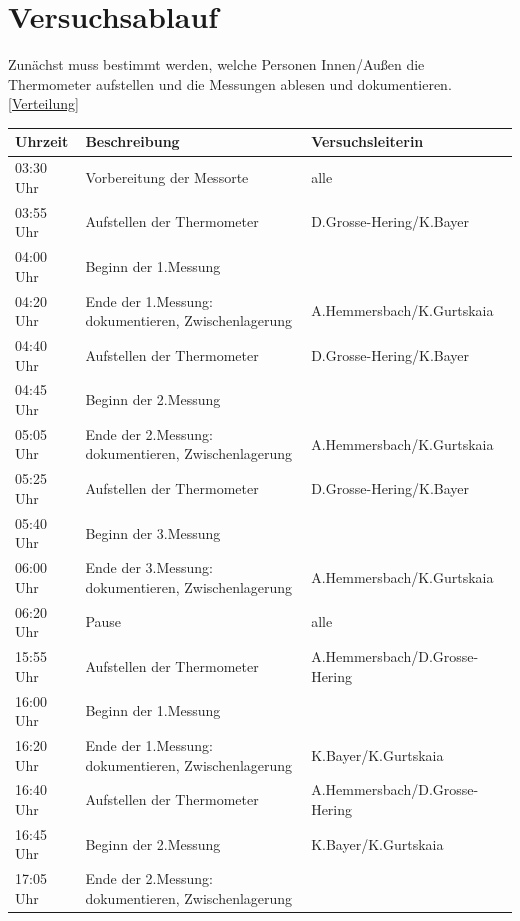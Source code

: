 \documentclass[ ngerman, fontsize= 12pt, paper=a4, headings=big, titlepage=true]{article}
\begin{document}
	\section{Versuchsablauf}
	Zunächst muss bestimmt werden, welche Personen Innen/Außen die Thermometer aufstellen und die Messungen ablesen und dokumentieren. \ref{Verteilung}
	\begin{table}[h]
		\begin{tabular}{l|l|l}
			
			Uhrzeit		&	Beschreibung									&	Versuchsleiterin \\
			\hline
			03:30 Uhr	&	Vorbereitung der Messorte						& alle\\
			03:55 Uhr	&	Aufstellen der Thermometer						& D.Grosse-Hering/K.Bayer\\
			04:00 Uhr	&	Beginn der 1.Messung							& \\
			04:20 Uhr	& 	Ende der 1.Messung: dokumentieren, Zwischenlagerung & A.Hemmersbach/K.Gurtskaia\\
			
			04:40 Uhr	&	Aufstellen der Thermometer						&D.Grosse-Hering/K.Bayer\\
			04:45 Uhr	&	Beginn der 2.Messung							& \\
			05:05 Uhr	& 	Ende der 2.Messung: dokumentieren, Zwischenlagerung & A.Hemmersbach/K.Gurtskaia\\
			
			05:25 Uhr	&	Aufstellen der Thermometer						&D.Grosse-Hering/K.Bayer\\
			05:40 Uhr	&	Beginn der 3.Messung							& \\
			06:00 Uhr	& 	Ende der 3.Messung: dokumentieren, Zwischenlagerung & A.Hemmersbach/K.Gurtskaia\\
			
			\hline
			06:20 Uhr	& 	Pause											& alle \\
			\hline
			
			15:55 Uhr	&	Aufstellen der Thermometer						&A.Hemmersbach/D.Grosse-Hering\\
			16:00 Uhr	&	Beginn der 1.Messung							& \\
			16:20 Uhr	& 	Ende der 1.Messung: dokumentieren, Zwischenlagerung &K.Bayer/K.Gurtskaia \\
			
			16:40 Uhr	&	Aufstellen der Thermometer						&A.Hemmersbach/D.Grosse-Hering\\
			16:45 Uhr	&	Beginn der 2.Messung							&K.Bayer/K.Gurtskaia\\
			17:05 Uhr	& 	Ende der 2.Messung: dokumentieren, Zwischenlagerung &\\
			

\end{tabular}
\end{table}
\end{document}
